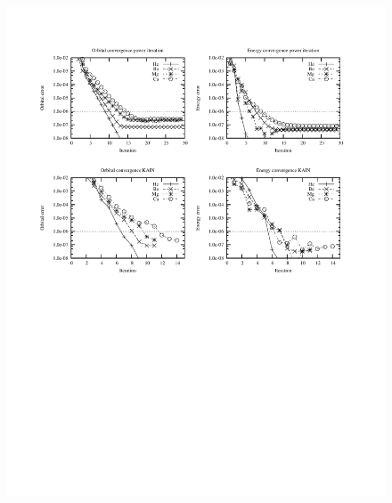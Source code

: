 \begin{frame}
\begin{columns}
    \begin{column}[b]{0.45\textwidth}
    \begin{figure}
	\includegraphics[scale=0.5, clip, viewport = 50 550 300 740]
                {figures/accuracy.pdf}
    \end{figure}
    \begin{figure}

\end{figure}
\end{column}
\end{columns}
\end{frame}
